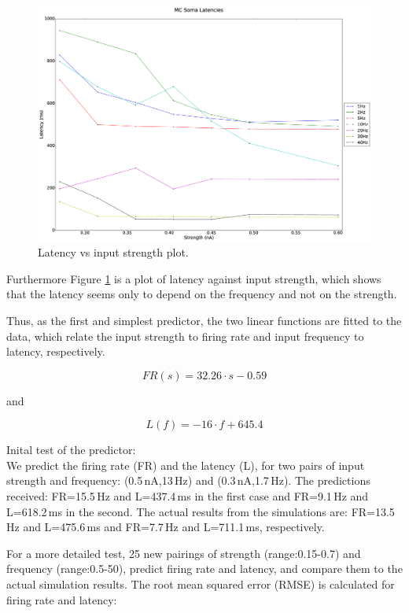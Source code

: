 \documentclass[11pt]{report}
\begin{document}
\begin{figure}[!ht]
\centering
\includegraphics[width=\textwidth]{Figures/MC_Soma_latencies_vs_strength_circuit_4}
\caption{Latency vs input strength plot.}
\label{fig:lat-strength}
\end{figure}

Furthermore Figure \ref{fig:lat-strength} is a plot of latency against input strength, which shows that the latency seems only to depend on the frequency and not on the strength.

Thus, as the first and simplest predictor, the two linear functions are fitted to the data, which relate the input strength to firing rate and input frequency to latency, respectively.

\[
 FR(s) = 32.26\cdot s - 0.59
\]

and 

\[
 L(f) = -16\cdot f + 645.4
\]

Inital test of the predictor:\\
We predict the firing rate (FR) and the latency (L), for two pairs of input strength and frequency: (0.5\,nA,13\,Hz) and (0.3\,nA,1.7\,Hz).
The predictions received: FR=15.5\,Hz and L=437.4\,ms in the first case and  FR=9.1\,Hz and L=618.2\,ms in the second.
The actual results from the simulations are: FR=13.5\,Hz and L=475.6\,ms and FR=7.7\,Hz and L=711.1\,ms, respectively.

For a more detailed test, 25 new pairings of strength (range:0.15-0.7) and frequency (range:0.5-50), predict firing rate and latency, and compare them to the actual simulation results.
The root mean squared error (RMSE) is calculated for firing rate and latency:
\end{document}
